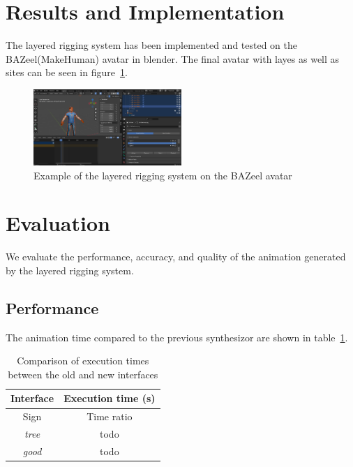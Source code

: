 \documentclass[../../main.tex]{subfiles}
\begin{document}
\section{Results and Implementation}
\label{ch:rigging_layers:results}

The layered rigging system has been implemented and tested on the BAZeel(MakeHuman) avatar in blender. The final avatar with layes as well as sites can be seen in figure~\ref{fig:layers_example}.

\begin{figure}
    \centering
    \includegraphics[width=0.5\textwidth]{chapters/rigging_layers/images/layers_example.png}
    \caption{Example of the layered rigging system on the BAZeel avatar}
    \label{fig:layers_example}
\end{figure}

\section{Evaluation}
\label{ch:rigging_layers:evaluation}

We evaluate the performance, accuracy, and quality of the animation generated by the layered rigging system.

\subsection{Performance}
\label{ch:rigging_layers:evaluation:performance}

The animation time compared to the previous synthesizor are shown in table~\ref{tab:faster_executions}.

\begin{table}
    \centering
    \begin{tabular}{|c|c|}
        \hline
        \textbf{Interface} & \textbf{Execution time (s)} \\
        \hline
        Sign & Time ratio \\
        \emph{tree} & todo \\
        \emph{good} & todo \\
        \hline
    \end{tabular}
    \caption{Comparison of execution times between the old and new interfaces}
    \label{tab:faster_executions}
\end{table}
\end{document}
